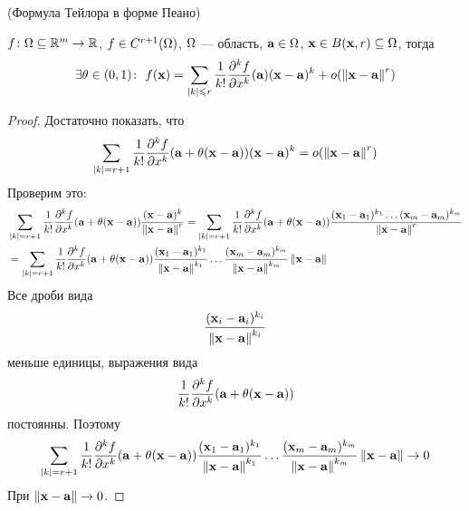 \begin{theorem}(Формула Тейлора в форме Пеано)

    $f \colon \Omega \subseteq \mathbb{R}^m \to \mathbb{R}$, $f \in C^{r+1}(\Omega)$, $\Omega$ --- область,
    $\mathbf{a} \in \Omega$, $\mathbf{x} \in B(\mathbf{x}, r) \subseteq \Omega$, тогда
\[
    \exists \theta \in (0, 1)\colon~
    f(\mathbf{x}) = \sum_{|k| \leqslant r}{\frac{1}{k!}
    \frac{\partial^k f}{\partial x^k}(\mathbf{a}) (\mathbf{x} - \mathbf{a})^k}
    + o(\left\lVert\mathbf{x} - \mathbf{a}\right\rVert^r)
\]
\end{theorem}
\begin{proof}
    Достаточно показать, что
\[
    \sum_{|k| = r+1}{\frac{1}{k!} \frac{\partial^k f}{\partial x^k}(\mathbf{a} +
    \theta(\mathbf{x} - \mathbf{a}))(\mathbf{x} - \mathbf{a})^k} = o(\left\lVert\mathbf{x} - \mathbf{a}\right\rVert^r)
\]
    Проверим это:
\begin{align*}
    &\sum_{|k| = r+1}{\frac{1}{k!} \frac{\partial^k f}{\partial x^k}(\mathbf{a} +
    \theta(\mathbf{x} - \mathbf{a})) \frac{(\mathbf{x} - \mathbf{a})^k}{\left\lVert\mathbf{x} - \mathbf{a}\right\rVert^r}}
    = \sum_{|k| = r+1}{\frac{1}{k!} \frac{\partial^k f}{\partial x^k}(\mathbf{a} +
    \theta(\mathbf{x} - \mathbf{a})) \frac{(\mathbf{x}_1 - \mathbf{a}_1)^{k_1} \ldots (\mathbf{x}_m -
    \mathbf{a}_m)^{k_m}}{\left\lVert\mathbf{x} - \mathbf{a}\right\rVert^r}} \\
    &= \sum_{|k| = r+1}{\frac{1}{k!} \frac{\partial^k f}{\partial x^k}(\mathbf{a} +
    \theta(\mathbf{x} - \mathbf{a})) \frac{(\mathbf{x}_1 - \mathbf{a}_1)^{k_1}}{\left\lVert\mathbf{x} - \mathbf{a}\right\rVert^{k_1}} \ldots
    \frac{(\mathbf{x}_m - \mathbf{a}_m)^{k_m}}{\left\lVert\mathbf{x} - \mathbf{a}\right\rVert^{k_m}}} \left\lVert\mathbf{x} - \mathbf{a}\right\rVert
\end{align*}
    Все дроби вида
\[
    \frac{(\mathbf{x}_i - \mathbf{a}_i)^{k_i}}{\left\lVert\mathbf{x} - \mathbf{a}\right\rVert^{k_i}}
\]
    меньше единицы, выражения вида
\[
    \frac{1}{k!} \frac{\partial^k f}{\partial x^k}(\mathbf{a} + \theta(\mathbf{x} - \mathbf{a}))
\]
    постоянны. Поэтому
\[
    \sum_{|k| = r+1}{\frac{1}{k!} \frac{\partial^k f}{\partial x^k}(\mathbf{a} +
    \theta(\mathbf{x} - \mathbf{a})) \frac{(\mathbf{x}_1 - \mathbf{a}_1)^{k_1}}{\left\lVert\mathbf{x} - \mathbf{a}\right\rVert^{k_1}} \ldots
    \frac{(\mathbf{x}_m - \mathbf{a}_m)^{k_m}}{\left\lVert\mathbf{x} - \mathbf{a}\right\rVert^{k_m}}} \left\lVert\mathbf{x} - \mathbf{a}\right\rVert \to 0
\]
    При $\left\lVert\mathbf{x} - \mathbf{a}\right\rVert \to 0$.
\end{proof}
